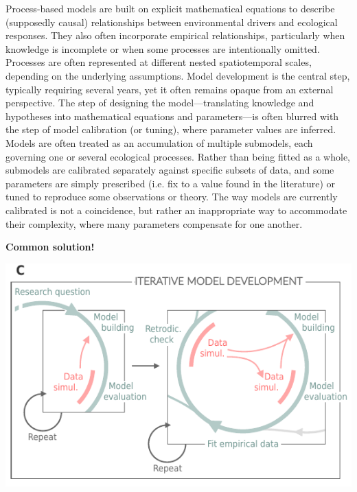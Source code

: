 \documentclass[11pt]{article}
\begin{document}
\begin{tcolorbox}[
sharp corners=all,
colback=white,
colframe=black,
size=tight,
boxrule=0.1mm,
left=3mm,right=3mm, top = 2mm, bottom = 2mm,
fontupper=\small
]
{\begin{multicols}{2}
\noindent Process-based models are built on explicit mathematical equations to describe (supposedly causal) relationships between environmental drivers and ecological responses. They also often incorporate empirical relationships, particularly when knowledge is incomplete or when some processes are intentionally omitted. Processes are often represented at different nested spatiotemporal scales, depending on the underlying assumptions. Model development is the central step, typically requiring several years, yet it often remains opaque from an external perspective. The step of designing the model---translating knowledge and hypotheses into mathematical equations and parameters---is often blurred with the step of model calibration (or tuning), where parameter values are inferred. Models are often treated as an accumulation of multiple submodels, each governing one or several ecological processes. Rather than being fitted as a whole, submodels are calibrated separately against specific subsets of data, and some parameters are simply prescribed (i.e. fix to a value found in the literature) or tuned to reproduce some observations or theory. The way models are currently calibrated is not a coincidence, %
but rather an inappropriate way to accommodate their complexity, where many parameters compensate for one another.

\vfill

\end{multicols}}

\centerline{\bf Common solution!}
\vspace{0.2cm}
\begin{minipage}[t]{\linewidth}
    \includegraphics[width=\linewidth]{figures/iterativeworkflow_details}

    \vspace{-0.6cm}\label{fig:trends}
\end{minipage}

\end{tcolorbox}
\end{document}
